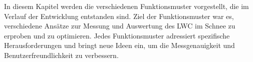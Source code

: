 
In diesem Kapitel werden die verschiedenen Funktionsmuster vorgestellt, die im Verlauf der Entwicklung entstanden sind. Ziel der Funktionsmuster war es, verschiedene Ansätze zur Messung und Auswertung des LWC im Schnee zu erproben und zu optimieren. Jedes Funktionsmuster adressiert spezifische Herausforderungen und bringt neue Ideen ein, um die Messgenauigkeit und Benutzerfreundlichkeit zu verbessern.
